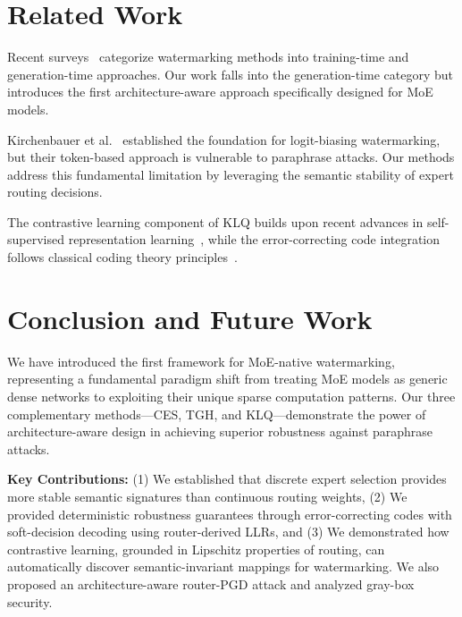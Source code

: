 \section{Related Work}

Recent surveys~\cite{christ2023watermarking,li2023survey} categorize watermarking methods into training-time and generation-time approaches. Our work falls into the generation-time category but introduces the first architecture-aware approach specifically designed for MoE models.

Kirchenbauer et al.~\cite{kirchenbauer2023watermark} established the foundation for logit-biasing watermarking, but their token-based approach is vulnerable to paraphrase attacks. Our methods address this fundamental limitation by leveraging the semantic stability of expert routing decisions.

The contrastive learning component of KLQ builds upon recent advances in self-supervised representation learning~\cite{chen2020simple}, while the error-correcting code integration follows classical coding theory principles~\cite{macwilliams1977theory}.

\section{Conclusion and Future Work}

We have introduced the first framework for MoE-native watermarking, representing a fundamental paradigm shift from treating MoE models as generic dense networks to exploiting their unique sparse computation patterns. Our three complementary methods—CES, TGH, and KLQ—demonstrate the power of architecture-aware design in achieving superior robustness against paraphrase attacks.

\textbf{Key Contributions:} (1) We established that discrete expert selection provides more stable semantic signatures than continuous routing weights, (2) We provided deterministic robustness guarantees through error-correcting codes with soft-decision decoding using router-derived LLRs, and (3) We demonstrated how contrastive learning, grounded in Lipschitz properties of routing, can automatically discover semantic-invariant mappings for watermarking. We also proposed an architecture-aware router-PGD attack and analyzed gray-box security.

